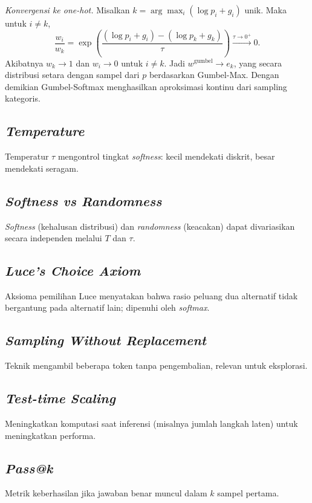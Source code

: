 \textit{Konvergensi ke one-hot.} Misalkan \(k = \arg\max_i (\log p_i + g_i)\) unik. Maka untuk \(i \neq k\),
\begin{equation}
\frac{w_i}{w_k} = \exp\left( \frac{(\log p_i + g_i) - (\log p_k + g_k)}{\tau} \right) \xrightarrow{\tau \to 0^+} 0.
\end{equation}
Akibatnya \(w_k \to 1\) dan \(w_i \to 0\) untuk \(i \neq k\). Jadi \(w^{\mathrm{gumbel}} \to e_k\), yang secara distribusi setara dengan sampel dari \(p\) berdasarkan Gumbel-Max. Dengan demikian Gumbel-Softmax menghasilkan aproksimasi kontinu dari sampling kategoris.

\subsection{\textit{Temperature}}
Temperatur \(\tau\) mengontrol tingkat \textit{softness}: kecil mendekati diskrit, besar mendekati seragam.

\subsection{\textit{Softness vs Randomness}}
\textit{Softness} (kehalusan distribusi) dan \textit{randomness} (keacakan) dapat divariasikan secara independen melalui \(T\) dan \(\tau\).

\subsection{\textit{Luce's Choice Axiom}}
Aksioma pemilihan Luce menyatakan bahwa rasio peluang dua alternatif tidak bergantung pada alternatif lain; dipenuhi oleh \textit{softmax}.

\subsection{\textit{Sampling Without Replacement}}
Teknik mengambil beberapa token tanpa pengembalian, relevan untuk eksplorasi.

\subsection{\textit{Test-time Scaling}}
Meningkatkan komputasi saat inferensi (misalnya jumlah langkah laten) untuk meningkatkan performa.

\subsection{\textit{Pass@k}}
Metrik keberhasilan jika jawaban benar muncul dalam \(k\) sampel pertama.

